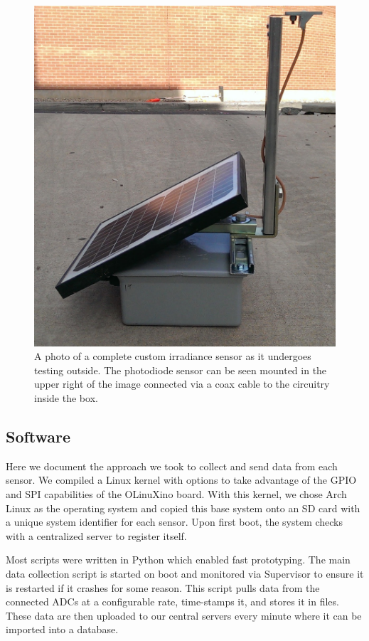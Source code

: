 \begin{figure}[p]
\centering
  \includegraphics[width=.7\textwidth]{figs/sensor_outside.jpg}
\caption[A complete custom sensor]{A photo of a complete custom
  irradiance sensor as it undergoes testing outside. The photodiode
  sensor can be seen mounted in the upper right of the image connected
  via a coax cable to the circuitry inside the box.}
\label{fig:sensor_outside}
\end{figure}

\subsection{Software}
Here we document the approach we took to collect and send data from
each sensor.
We compiled a Linux kernel with options to take advantage of
the GPIO and SPI capabilities of the OLinuXino board.
With this kernel, we chose Arch Linux as the operating system and
copied this base system onto an SD card with a unique system
identifier for each sensor.
Upon first boot, the system checks with a centralized server to
register itself.

Most scripts were written in Python which enabled fast prototyping.
The main data collection script is started on boot and monitored via
Supervisor to ensure it is restarted if it crashes for some reason.
This script pulls data from the connected ADCs at a configurable rate,
time-stamps it, and stores it in files.
These data are then uploaded to our central servers every minute where
it can be imported into a database.


